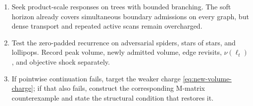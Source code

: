 \begin{enumerate}[leftmargin=2em]
on a fully materialized exact restricted optimum already removes the hold
logarithm by changing the control policy, while
\cref{prop:complete-gate-explicit-cholesky-expander-stop} proves that no
ordinary sparse ordering removes the cubic factor on full-support expanders.
Do not spend another proof round optimizing that explicit factor; seek a
compressed, matrix-free, iterative, approximate, or otherwise non-Cholesky
response.  The threshold-tuned endpoint path remains a finite
mechanism STOP because its gate certifies before the critical face.
Charge every correction and
support scan, Schur query, restricted-optimum solve, transport, and energy
evaluation.  Do not promote any finite trace or scalar balance to a
convergence failure, work lower bound, or asymptotic telescope.
\item Seek product-scale responses on trees with bounded branching.  The soft
horizon already covers simultaneous boundary admissions on every graph, but
dense transport and repeated active scans remain overcharged.
\item Test the zero-padded recurrence on adversarial spiders, stars of stars,
and lollipops.  Record peak volume, newly admitted volume, edge revisits,
$\nu(\ell_t)$, and objective shock separately.
\item If pointwise continuation fails, target the weaker charge
\cref{eq:new-volume-charge}; if that also fails, construct the corresponding
M-matrix counterexample and state the structural condition that restores it.
\end{enumerate}

